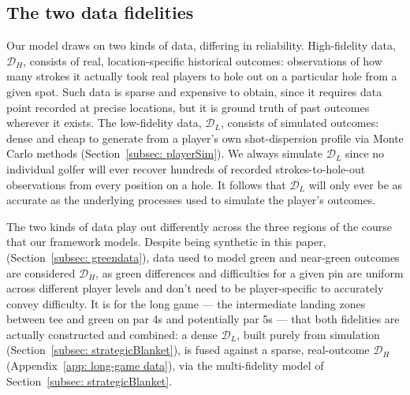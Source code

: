 \documentclass[11pt, letterpaper]{article}
\begin{document}
\subsection{The two data fidelities} 
\label{ref:idealData}

Our model draws on two kinds of data, differing in reliability. High-fidelity data, $\mathcal{D}_H$, consists of real, location-specific historical outcomes: observations of how many strokes it actually took real players to hole out on a particular hole from a given spot. Such data is sparse and expensive to obtain, since it requires data point recorded at precise locations, but it is ground truth of past outcomes wherever it exists. The low-fidelity data, $\mathcal{D}_L$, consists of simulated  outcomes: dense and cheap to generate from a player's own shot-dispersion profile via Monte Carlo
methods (Section~\ref{subsec: playerSim}). We always simulate $\mathcal{D}_L$ since no individual golfer will ever recover hundreds of recorded strokes-to-hole-out observations from every position on a hole. It follows that $\mathcal{D}_L$ will only ever be as accurate as the underlying processes used to simulate the player's outcomes.

The two kinds of data play out differently across the three regions of the course that our framework models. Despite being 
synthetic in this paper, (Section~\ref{subsec: greendata}), data used to model green and near-green outcomes are considered $\mathcal{D}_H$, as green differences and difficulties for a given pin are uniform across different player levels and don't need to be player-specific to accurately convey difficulty.
It is for the long game --- the intermediate landing zones between tee and green on par 4s and potentially par 5s --- that both fidelities are actually constructed and combined: a dense $\mathcal{D}_L$, built purely from simulation (Section~\ref{subsec: strategicBlanket}), is fused against a sparse, real-outcome $\mathcal{D}_H$ (Appendix~\ref{app: long-game data}), via the multi-fidelity model of Section~\ref{subsec: strategicBlanket}.
\end{document}
